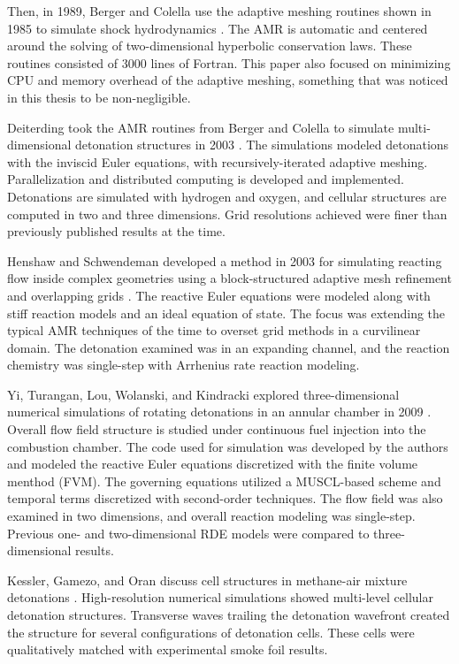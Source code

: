 Then, in 1989, Berger and Colella use the adaptive meshing routines shown in 1985 to simulate shock hydrodynamics \cite{berger1989}. The AMR is automatic and centered around the solving of two-dimensional hyperbolic conservation laws. These routines consisted of 3000 lines of Fortran. This paper also focused on minimizing CPU and memory overhead of the adaptive meshing, something that was noticed in this thesis to be non-negligible. 

Deiterding took the AMR routines from Berger and Colella to simulate multi-dimensional detonation structures in 2003 \cite{deiterding}. The simulations modeled detonations with the inviscid Euler equations, with recursively-iterated adaptive meshing. Parallelization and distributed computing is developed and implemented. Detonations are simulated with hydrogen and oxygen, and cellular structures are computed in two and three dimensions. Grid resolutions achieved were finer than previously published results at the time. 

Henshaw and Schwendeman developed a method in 2003 for simulating reacting flow inside complex geometries using a block-structured adaptive mesh refinement and overlapping grids \cite{henshaw}. The reactive Euler equations were modeled along with stiff reaction models and an ideal equation of state. The focus was extending the typical AMR techniques of the time to overset grid methods in a curvilinear domain. The detonation examined was in an expanding channel, and the reaction chemistry was single-step with Arrhenius rate reaction modeling. 

Yi, Turangan, Lou, Wolanski, and Kindracki explored three-dimensional numerical simulations of rotating detonations in an annular chamber in 2009 \cite{yi}. Overall flow field structure is studied under continuous fuel injection into the combustion chamber. The code used for simulation was developed by the authors and modeled the reactive Euler equations discretized with the finite volume menthod (FVM). The governing equations utilized a MUSCL-based scheme \cite{vanleer} and temporal terms discretized with second-order techniques. The flow field was also examined in two dimensions, and overall reaction modeling was single-step. Previous one- and two-dimensional RDE models were compared to three-dimensional results. 

Kessler, Gamezo, and Oran discuss cell structures in methane-air mixture detonations \cite{kessler}. High-resolution numerical simulations showed multi-level cellular detonation structures. Transverse waves trailing the detonation wavefront created the structure for several configurations of detonation cells. These cells were qualitatively matched with experimental smoke foil results. 

